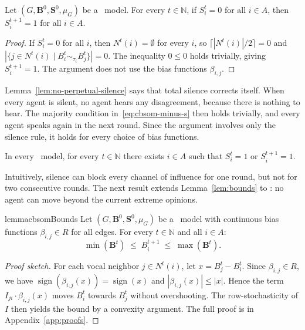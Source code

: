 \begin{lemma}
\label{lem:no-perpetual-silence}
  Let $(G,\mathbf{B}^0,\mathbf{S}^0,\mu_G)$ be a \CBSOMminus\ model.
  For every $t\in\mathbb{N}$, if $S_i^t=0$ for all $i\in A$, then
  $S_i^{t+1}=1$ for all $i\in A$.
\end{lemma}

\begin{proof}
  If $S_i^t=0$ for all $i$, then $N^t(i)=\emptyset$ for every $i$,
  so $\lceil|N^t(i)|/2\rceil=0$ and
  $|\{j\in N^t(i)\mid B_i^t\sim_{\tau_i}B_j^t\}|=0$.
  The inequality $0\le 0$ holds trivially, giving $S_i^{t+1}=1$.
  The argument does not use the bias functions $\beta_{i,j}$.
\end{proof}

Lemma~\ref{lem:no-perpetual-silence} says that total silence corrects
itself. When every agent is silent, no agent hears
any disagreement, because there is nothing to hear. The majority
condition in~\eqref{eq:cbsom-minus-s} then holds trivially, and every
agent speaks again in the next round. Since the argument involves only
the silence rule, it holds for every choice of bias functions.

\begin{corollary}
\label{cor:no-perpetual-silence}
  In every \CBSOMminus\ model, for every $t\in\mathbb{N}$ there exists
  $i\in A$ such that $S_i^t=1$ or $S_i^{t+1}=1$.
\end{corollary}

Intuitively, silence can block every channel of influence for one round,
but not for two consecutive rounds. The next result extends
Lemma~\ref{lem:bounds} to \CBSOMminus: no agent can move beyond the
current extreme opinions.

\begin{restatable}{lemma}{cbsomBounds}
\label{lem:cbsom-bounds}
  Let $(G,\mathbf{B}^0,\mathbf{S}^0,\mu_G)$ be a \CBSOMminus\ model
  with continuous bias functions $\beta_{i,j}\in R$ for all edges.
  For every $t\in\mathbb{N}$ and all $i\in A$:
  \[\min(\mathbf{B}^t)\;\le\; B_i^{t+1}\;\le\;\max(\mathbf{B}^t).\]
\end{restatable}

\begin{proof}[Proof sketch]
  For each vocal neighbor $j\in N^t(i)$, let $x=B_j^t-B_i^t$.
  Since $\beta_{i,j}\in R$, we have $\operatorname{sign}(\beta_{i,j}(x))=
  \operatorname{sign}(x)$ and $|\beta_{i,j}(x)|\le|x|$. Hence the term
  $I_{ji}\cdot\beta_{i,j}(x)$ moves $B_i^t$ towards $B_j^t$ without
  overshooting. The row-stochasticity of $I$ then yields the bound by a
  convexity argument. The full proof is in Appendix~\ref{app:proofs}.
\end{proof}

